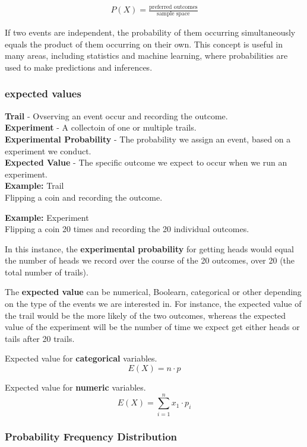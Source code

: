 \documentclass{article}
\begin{document}
\begin{align*}
  P(X)=\frac{\text{preferred outcomes}}{\text{sample space}}
\end{align*}

If two events are independent, the probability of them occurring simultaneously
equals the product of them occurring on their own. This concept is useful in
many areas, including statistics and machine learning, where probabilities are
used to make predictions and inferences.

\subsubsection{expected values}
\textbf{Trail} - Ovserving an event occur and recording the outcome.\\
\textbf{Experiment} - A collectoin of one or multiple trails.\\
\textbf{Experimental Probability} - The probability we assign an event, based on a experiment we conduct.\\
\textbf{Expected Value} - The specific outcome we expect to occur when we run an experiment.\\

\textbf{Example:} Trail\\
Flipping a coin and recording the outcome.

\textbf{Example:} Experiment\\
Flipping a coin 20 times and recording the 20 individual outcomes.

In this instance, the \textbf{experimental probability} for getting heads would
equal the number of heads we record over the course of the 20 outcomes, over 20
(the total number of trails).

The \textbf{expected value} can be numerical, Boolearn, categorical or other
depending on the type of the events we are interested in. For instance, the
expected value of the trail would be the more likely of the two outcomes,
whereas the expected value of the experiment will be the number of time we
expect get either heads or tails after 20 trails.

Expected value for \textbf{categorical} variables.
\[E(X)=n \cdot p\]

Expected value for \textbf{numeric} variables.
\[E(X)=\displaystyle\sum_{i=1}^{n}x_1\cdot p_i\]

\subsubsection{Probability Frequency Distribution}
\end{document}
